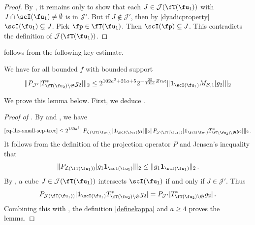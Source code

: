     \begin{proof}\leanok
        By , it remains only to show that each $J \in \mathcal{J}(\fT(\fu_1))$ with $J \cap \scI(\fu_1) \ne \emptyset$ is in $\mathcal{J}'$. But if $J \notin \mathcal{J}'$, then by \eqref{dyadicproperty} $\scI(\fu_1) \subsetneq J$. Pick $\fp \in \fT(\fu_1)$. Then $\scI(\fp) \subsetneq J$. This contradicts the definition of $\mathcal{J}(\fT(\fu_1))$.
    \end{proof}

     follows from the following key estimate.

    \begin{lemma}
        \label{bound-for-tree-projection}
        \leanok
        We have for all bounded $f$ with bounded support
        $$
            \|P_{\mathcal{J}'}|T_{\fT(\fu_2) \setminus \mathfrak{S}}^* g_2|\|_2
            \le 2^{102a^3+21a+5} 2^{-\frac{25}{101a}Zn\kappa} \|\mathbf{1}_{\scI(\fu_1)} M_{\mathcal{B},1} |g_2|\|_2
        $$
    \end{lemma}

    We prove this lemma below. First, we deduce .

    \begin{proof}[Proof of ]
        \leanok
        By  and , we have
        \begin{align*}
            \eqref{eq-lhs-small-sep-tree} \le 2^{130a^3} \|P_{\mathcal{L}(\fT(\fu_1))} |\mathbf{1}_{\scI(\fu_1)}g_1| \|_2 \|P_{\mathcal{J}(\fT(\fu_1) )}|\mathbf{1}_{\scI(\fu_1)} T_{\fT(\fu_2) \setminus \mathfrak{S}}^* g_2|\|_2\,.
        \end{align*}
        It follows from the definition of the projection operator $P$ and Jensen's inequality that
        $$
            \|P_{\mathcal{L}(\fT(\fu_1))} |g_1\mathbf{1}_{\scI(\fu_1)}| \|_2 \le \|g_1 \mathbf{1}_{\scI(\fu_1)}\|_2\,.
        $$
        By , a cube $J \in \mathcal{J}(\fT(\fu_1))$ intersects $\scI(\fu_1)$ if and only if $J \in \mathcal{J}'$. Thus
        $$
            P_{\mathcal{J}(\fT(\fu_1) )}|\mathbf{1}_{\scI(\fu_1)} T_{\fT(\fu_2) \setminus \mathfrak{S}}^* g_2| = P_{\mathcal{J}'}|T_{\fT(\fu_2) \setminus \mathfrak{S}}^* g_2|\,.
        $$
        Combining this with , the definition \eqref{definekappa} and $a \ge 4$ proves the lemma.
    \end{proof}

